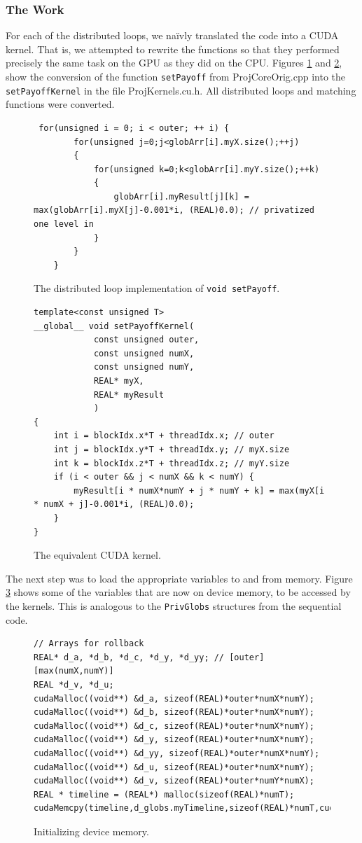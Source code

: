 \documentclass[12pt, oneside]{article}
\begin{document}
\subsubsection{The Work}
For each of the distributed loops, we na\"ivly translated the code into a CUDA kernel. That is, we attempted to rewrite the functions so that they performed precisely the same task on the GPU as they did on the CPU. Figures \ref{fig:nokernel} and \ref{fig:yeskernel}, show the conversion of the function \texttt{setPayoff} from ProjCoreOrig.cpp into the \texttt{setPayoffKernel} in the file ProjKernels.cu.h. All distributed loops and matching functions were converted.
\begin{figure}[h]
	\begin{lstlisting}
 for(unsigned i = 0; i < outer; ++ i) {
        for(unsigned j=0;j<globArr[i].myX.size();++j)
        {
            for(unsigned k=0;k<globArr[i].myY.size();++k)
            {
                globArr[i].myResult[j][k] = max(globArr[i].myX[j]-0.001*i, (REAL)0.0); // privatized one level in
            }
        }
    }
\end{lstlisting}
\caption{ \label{fig:nokernel} The distributed loop implementation of \texttt{void setPayoff}.}
\end{figure}
\begin{figure}[h]
\begin{lstlisting}
template<const unsigned T>
__global__ void setPayoffKernel(
			const unsigned outer,
			const unsigned numX,
			const unsigned numY,
			REAL* myX,
			REAL* myResult
			)
{
	int i = blockIdx.x*T + threadIdx.x; // outer
	int j = blockIdx.y*T + threadIdx.y; // myX.size
	int k = blockIdx.z*T + threadIdx.z; // myY.size
	if (i < outer && j < numX && k < numY) {
		myResult[i * numX*numY + j * numY + k] = max(myX[i * numX + j]-0.001*i, (REAL)0.0);
	}
}
\end{lstlisting}
\caption{ \label{fig:yeskernel} The equivalent CUDA kernel.}
\end{figure}
					
The next step was to load the appropriate variables to and from memory. Figure \ref{fig:cudamemcopy} shows some of the variables that are now on device memory, to be accessed by the kernels. This is analogous to the \texttt{PrivGlobs} structures from the sequential code.
					
\begin{figure}[h]
\begin{lstlisting}
// Arrays for rollback
REAL* d_a, *d_b, *d_c, *d_y, *d_yy; // [outer][max(numX,numY)]
REAL *d_v, *d_u;
cudaMalloc((void**) &d_a, sizeof(REAL)*outer*numX*numY);
cudaMalloc((void**) &d_b, sizeof(REAL)*outer*numX*numY);
cudaMalloc((void**) &d_c, sizeof(REAL)*outer*numX*numY);
cudaMalloc((void**) &d_y, sizeof(REAL)*outer*numX*numY);
cudaMalloc((void**) &d_yy, sizeof(REAL)*outer*numX*numY);
cudaMalloc((void**) &d_u, sizeof(REAL)*outer*numX*numY);
cudaMalloc((void**) &d_v, sizeof(REAL)*outer*numY*numX);
REAL * timeline = (REAL*) malloc(sizeof(REAL)*numT);
cudaMemcpy(timeline,d_globs.myTimeline,sizeof(REAL)*numT,cudaMemcpyDeviceToHost);
\end{lstlisting}
\caption{ \label{fig:cudamemcopy} Initializing device memory.}
\end{figure}
						
\end{document}
